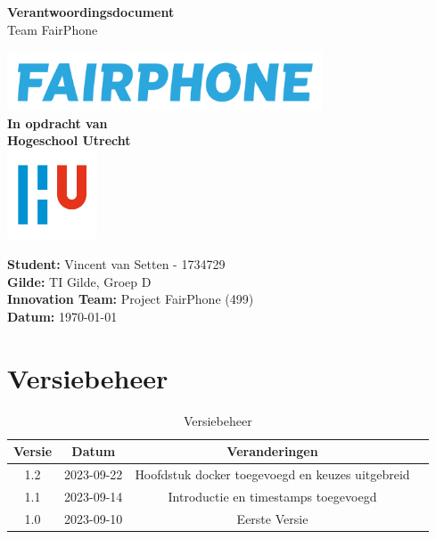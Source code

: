 \documentclass[a4paper]{report}
\begin{document}
\begin{titlepage}
  \begin{center}
      \vspace*{.9cm}
      \Huge
      \textbf{ Verantwoordingsdocument }\\
      \vspace{0.2cm}
      \small Team FairPhone

      \normalsize


      \vspace{2cm}
      \includegraphics[width=0.7\textwidth]{Images/fairphone.png}
      \vspace{2cm}
      \Large\\
      \textbf{In opdracht van}\\
      \large
      \textbf{Hogeschool Utrecht} \\
      \includegraphics[width=0.2\textwidth]{Images/logouni.png}


      \vfill
    \end{center}
      \textbf{Student:} Vincent van Setten - 1734729 \\
      \textbf{Gilde:} TI Gilde, Groep D\\
      \textbf{Innovation Team:} Project FairPhone (499) \\
      \textbf{Datum:} \today \\
      \vspace{2cm}
\end{titlepage}



\tableofcontents

\chapter{Versiebeheer}
\begin{table}[h]
    \centering
    \begin{tabular}{|c|c|c|p{5cm}|}
        \hline
        \textbf{Versie} & \textbf{Datum} & \textbf{Veranderingen}  \\
        \hline
        1.2    & 2023-09-22 & Hoofdstuk docker toegevoegd en keuzes uitgebreid \\
        \hline
        1.1    & 2023-09-14 & Introductie en timestamps toegevoegd\\
        \hline
        1.0    & 2023-09-10 & Eerste Versie \\
        \hline
    \end{tabular}
    \caption{Versiebeheer}
\end{table}
\end{document}
